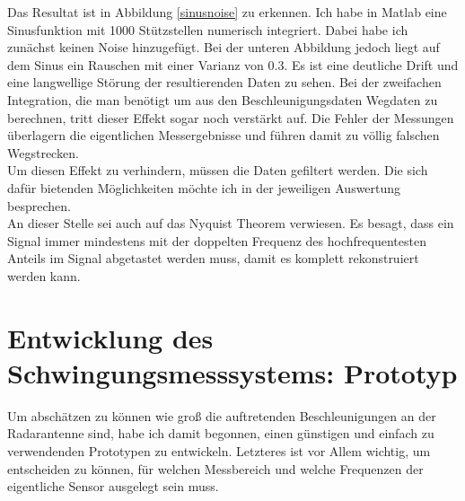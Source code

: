 \documentclass[12pt,a4paper,twoside,BCOR=12.5mm]{scrartcl}
\begin{document}
Das Resultat ist in Abbildung \ref{sinusnoise} zu erkennen. Ich habe in Matlab eine Sinusfunktion mit 1000 Stützstellen numerisch integriert. Dabei habe ich zunächst keinen Noise hinzugefügt. Bei der unteren Abbildung jedoch liegt auf dem Sinus ein Rauschen mit einer Varianz von $0.3$. Es ist eine deutliche Drift und eine langwellige Störung der resultierenden Daten zu sehen. Bei der zweifachen Integration, die man benötigt um aus den Beschleunigungsdaten Wegdaten zu berechnen, tritt dieser Effekt sogar noch verstärkt auf. Die Fehler der Messungen überlagern die eigentlichen Messergebnisse und führen damit zu völlig falschen Wegstrecken. \\

Um diesen Effekt zu verhindern, müssen die Daten gefiltert werden. Die sich dafür bietenden Möglichkeiten möchte ich in der jeweiligen Auswertung besprechen. \\

An dieser Stelle sei auch auf das Nyquist Theorem verwiesen. Es besagt, dass ein Signal immer mindestens mit der doppelten Frequenz des hochfrequentesten Anteils im Signal abgetastet werden muss, damit es komplett rekonstruiert werden kann.  \citep[vgl.][]{Shannon:1949uq}\\

\newpage






\section{Entwicklung des Schwingungsmesssystems: Prototyp}

Um abschätzen zu können wie groß die auftretenden Beschleunigungen an der Radarantenne sind, habe ich damit begonnen, einen günstigen und einfach zu verwendenden Prototypen zu entwickeln. Letzteres ist vor Allem wichtig, um entscheiden zu können, für welchen Messbereich und welche Frequenzen der eigentliche Sensor ausgelegt sein muss. \\
\end{document}
